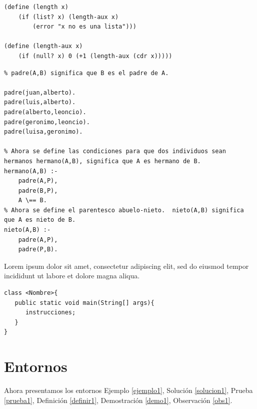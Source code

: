 \lstset{language=LISP}
\begin{lstlisting}[caption= C\'odigo LISP de una Lista, label = codL]
(define (length x)
    (if (list? x) (length-aux x)
        (error "x no es una lista")))

(define (length-aux x)
    (if (null? x) 0 (+1 (length-aux (cdr x)))))
\end{lstlisting}




\lstset{language=PROLOG}
\begin{lstlisting}[caption= C\'odigo PROLOG de un \'arbol geneal\'ogico, label=codP]
% Arbol genealogico version 1.
% padre(A,B) significa que B es el padre de A.

padre(juan,alberto).
padre(luis,alberto).
padre(alberto,leoncio).
padre(geronimo,leoncio).
padre(luisa,geronimo).

% Ahora se define las condiciones para que dos individuos sean hermanos hermano(A,B), significa que A es hermano de B.
hermano(A,B) :-
    padre(A,P),
    padre(B,P),
    A \== B.
% Ahora se define el parentesco abuelo-nieto.  nieto(A,B) significa que A es nieto de B.
nieto(A,B) :-
    padre(A,P),
    padre(P,B).
\end{lstlisting}

Lorem ipsum dolor sit amet, consectetur adipiscing elit, sed do eiusmod tempor incididunt ut labore et dolore magna aliqua.

   \lstset{language=java}
\begin{lstlisting}[caption= C\'odigo JAVA de una clase, label=codj]
class <Nombre>{
   public static void main(String[] args){
      instrucciones;
   }
}
\end{lstlisting}








\section{Entornos}
Ahora presentamos los entornos Ejemplo \ref{ejemplo1}, Solución \ref{solucion1}, Prueba \ref{prueba1}, Definición \ref{definir1}, Demostración \ref{demo1}, Observación \ref{obs1}.

\begin{ejemplo}\label{ejemplo1}
\lipsum[1] %
\end{ejemplo}

\begin{solucion}\label{solucion1}
\lipsum[1] %
\end{solucion}

